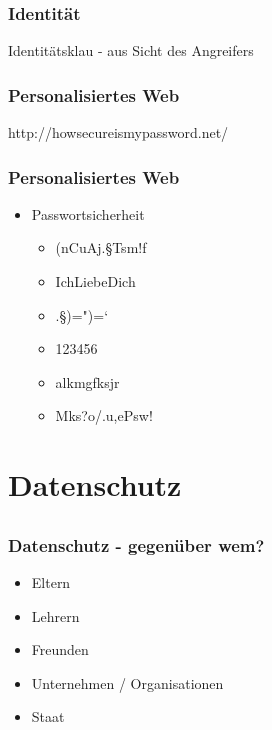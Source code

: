 \documentclass[12pt]{beamer}
\begin{document}
\begin{frame}
  \frametitle{Identität}
  \begin{center} \Large
    Identitätsklau - aus Sicht des Angreifers
  \end{center}
\end{frame}

\begin{frame}
  \frametitle{Personalisiertes Web}
  \begin{center} \Large
     http://howsecureismypassword.net/
  \end{center}
\end{frame}

\begin{frame}
  \frametitle{Personalisiertes Web}
  \begin{itemize}
    \item Passwortsicherheit 
      \begin{itemize}
        \item (nCuAj.§Tsm!f
        \item IchLiebeDich
        \item .§)=")=`
        \item 123456
        \item alkmgfksjr
        \item Mks?o/.u,ePsw!
      \end{itemize}
  \end{itemize}
\end{frame}

\section{Datenschutz}
\subsection{}

\begin{frame}
  \frametitle{Datenschutz - gegenüber wem?}
    \begin{itemize}
      \item<2-> Eltern
      \item<3-> Lehrern
      \item<4-> Freunden
      \item<5-> Unternehmen / Organisationen
      \item<6-> Staat
    \end{itemize}
\end{frame}
\end{document}
